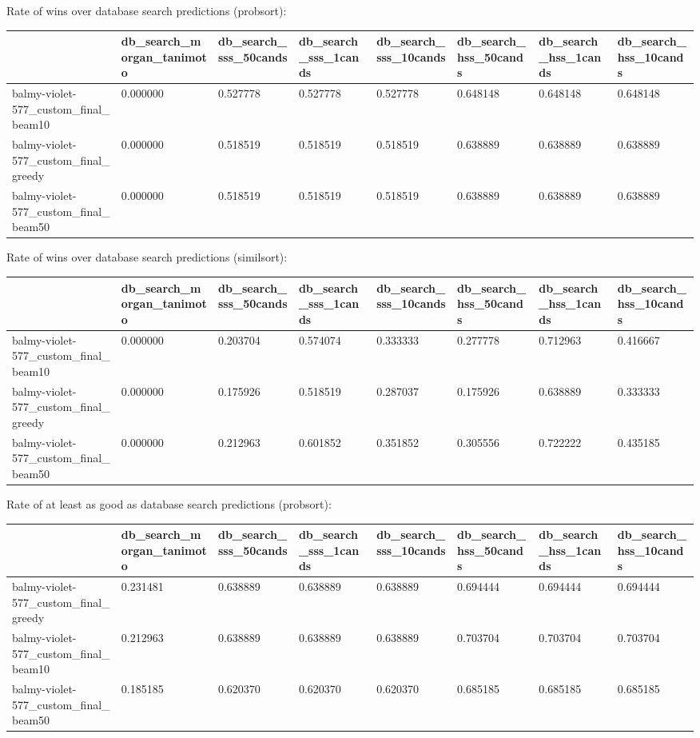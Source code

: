 Rate of wins over database search predictions (probsort):
\begin{tabular}{llllllll}
\toprule
 & db_search_morgan_tanimoto & db_search_sss_50cands & db_search_sss_1cands & db_search_sss_10cands & db_search_hss_50cands & db_search_hss_1cands & db_search_hss_10cands \\
\midrule
balmy-violet-577_custom_final_beam10 & 0.000000 & 0.527778 & 0.527778 & 0.527778 & 0.648148 & 0.648148 & 0.648148 \\
balmy-violet-577_custom_final_greedy & 0.000000 & 0.518519 & 0.518519 & 0.518519 & 0.638889 & 0.638889 & 0.638889 \\
balmy-violet-577_custom_final_beam50 & 0.000000 & 0.518519 & 0.518519 & 0.518519 & 0.638889 & 0.638889 & 0.638889 \\
\bottomrule
\end{tabular}



Rate of wins over database search predictions (similsort):
\begin{tabular}{llllllll}
\toprule
 & db_search_morgan_tanimoto & db_search_sss_50cands & db_search_sss_1cands & db_search_sss_10cands & db_search_hss_50cands & db_search_hss_1cands & db_search_hss_10cands \\
\midrule
balmy-violet-577_custom_final_beam10 & 0.000000 & 0.203704 & 0.574074 & 0.333333 & 0.277778 & 0.712963 & 0.416667 \\
balmy-violet-577_custom_final_greedy & 0.000000 & 0.175926 & 0.518519 & 0.287037 & 0.175926 & 0.638889 & 0.333333 \\
balmy-violet-577_custom_final_beam50 & 0.000000 & 0.212963 & 0.601852 & 0.351852 & 0.305556 & 0.722222 & 0.435185 \\
\bottomrule
\end{tabular}



Rate of at least as good as database search predictions (probsort):
\begin{tabular}{llllllll}
\toprule
 & db_search_morgan_tanimoto & db_search_sss_50cands & db_search_sss_1cands & db_search_sss_10cands & db_search_hss_50cands & db_search_hss_1cands & db_search_hss_10cands \\
\midrule
balmy-violet-577_custom_final_greedy & 0.231481 & 0.638889 & 0.638889 & 0.638889 & 0.694444 & 0.694444 & 0.694444 \\
balmy-violet-577_custom_final_beam10 & 0.212963 & 0.638889 & 0.638889 & 0.638889 & 0.703704 & 0.703704 & 0.703704 \\
balmy-violet-577_custom_final_beam50 & 0.185185 & 0.620370 & 0.620370 & 0.620370 & 0.685185 & 0.685185 & 0.685185 \\
\bottomrule
\end{tabular}



